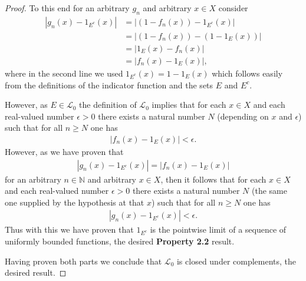 \begin{proof}
To this end for an arbitrary $g_n$ and arbitrary $x \in X$ consider
\begin{align}
    \left\lvert g_n(x) - 1_{E^c}(x) \right\rvert &= \left\lvert (1 - f_n(x)) - 1_{E^c}(x) \right\rvert \\
                                       &= \left\lvert (1 - f_n(x)) - (1 - 1_{E}(x)) \right\rvert \\
                                       &= \left\lvert 1_{E}(x) - f_n(x) \right\rvert \\
                                       &= \left\lvert f_n(x) - 1_{E}(x) \right\rvert,
\end{align}
where in the second line we used $1_{E^c}(x) = 1 - 1_{E}(x)$ which follows easily from the definitions of the indicator function and the sets $E$ and $E^c$.

However, as $E \in \mathcal{L}_0$ the definition of $\mathcal{L}_0$ implies that for each $x \in X$ and each real-valued number $\epsilon > 0$ there exists a natural number $N$ (depending on $x$ and $\epsilon$) such that for all $n \ge N$ one has
\begin{align}
    \left\lvert f_n(x) - 1_{E}(x) \right\rvert < \epsilon.
\end{align}
However, as we have proven that
\begin{align}
    \left\lvert g_n(x) - 1_{E^c}(x) \right\rvert = \left\lvert f_n(x) - 1_{E}(x) \right\rvert
\end{align}
for an arbitrary $n \in \mathbb{N}$ and arbitrary $x \in X$, then it follows that for each $x \in X$ and each real-valued number $\epsilon > 0$ there exists a natural number $N$ (the same one supplied by the hypothesis at that $x$) such that for all $n \ge N$ one has
\begin{align}
    \left\lvert g_n(x) - 1_{E^c}(x) \right\rvert < \epsilon.
\end{align}
Thus with this we have proven that $1_{E^c}$ is the pointwise limit of a sequence of uniformly bounded functions, the desired \textbf{Property 2.2} result.

Having proven both parts we conclude that $\mathcal{L}_0$ is closed under complements, the desired result.
\end{proof}

